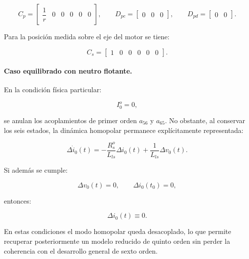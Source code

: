 \documentclass[10pt,a4paper]{article}
\begin{document}
\begin{equation}
	C_p=
	\begin{bmatrix}
		\dfrac{1}{r} & 0 & 0 & 0 & 0 & 0
	\end{bmatrix},
	\qquad
	D_{pc}=
	\begin{bmatrix}
		0 & 0 & 0
	\end{bmatrix},
	\qquad
	D_{pd}=
	\begin{bmatrix}
		0 & 0
	\end{bmatrix}.
	\label{eq:matrices_salida_lpv_6}
\end{equation}

Para la posición medida sobre el eje del motor se tiene:

\begin{equation}
	C_s=
	\begin{bmatrix}
		1 & 0 & 0 & 0 & 0 & 0
	\end{bmatrix}.
\end{equation}

\paragraph{Caso equilibrado con neutro flotante.}
En la condición física particular:

\begin{equation}
	I_0^o=0,
\end{equation}

se anulan los acoplamientos de primer orden $a_{56}$ y $a_{65}$. No obstante, al conservar los seis estados, la dinámica homopolar permanece explícitamente representada:

\begin{equation}
	\Delta\dot{i}_0(t)
	=
	-\frac{R_s^o}{L_{ls}}\Delta i_0(t)
	+\frac{1}{L_{ls}}\Delta v_0(t).
\end{equation}

Si además se cumple:

\begin{equation}
	\Delta v_0(t)=0,
	\qquad
	\Delta i_0(t_0)=0,
\end{equation}

entonces:

\begin{equation}
	\Delta i_0(t)\equiv0.
\end{equation}

En estas condiciones el modo homopolar queda desacoplado, lo que permite recuperar posteriormente un modelo reducido de quinto orden sin perder la coherencia con el desarrollo general de sexto orden.
\end{document}
